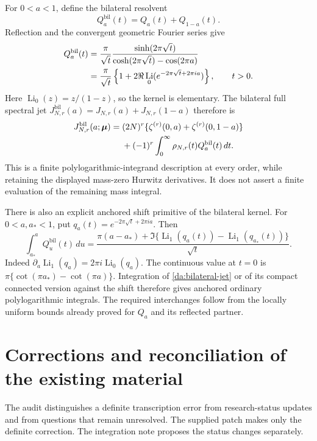 \documentclass[11pt,letterpaper]{article}
\numberwithin{equation}{section}
\theoremstyle{definition}
\theoremstyle{remark}
\DeclareMathOperator{\Li}{Li}
\newcommand{\dd}{\,d}
\begin{document}
For \(0<a<1\), define the bilateral resolvent
\[
 Q_a^{\mathrm{bil}}(t)=Q_a(t)+Q_{1-a}(t).
\]
Reflection and the convergent geometric Fourier series give
\begin{align}
 Q_a^{\mathrm{bil}}(t)
 &=\frac{\pi}{\sqrt t}
     \frac{\sinh(2\pi\sqrt t)}
          {\cosh(2\pi\sqrt t)-\cos(2\pi a)}\notag\\
 &=\frac{\pi}{\sqrt t}
       \left\{1+2\Re\Li_0(e^{-2\pi\sqrt t+2\pi ia})\right\},
             \qquad t>0. \label{da:bilateral-kernel}
\end{align}
Here \(\Li_0(z)=z/(1-z)\), so the kernel is elementary.
The bilateral full spectral jet
\(J_{N,r}^{\mathrm{bil}}(a)=J_{N,r}(a)+J_{N,r}(1-a)\) therefore is
\begin{align}
 J_{N,r}^{\mathrm{bil}}(a;\boldsymbol\mu)
 ={}&(2N)^r\{\zeta^{(r)}(0,a)+\zeta^{(r)}(0,1-a)\}\notag\\
 &+(-1)^r\int_0^\infty
          \rho_{N,r}(t)Q_a^{\mathrm{bil}}(t)\dd t.
 \label{da:bilateral-jet}
\end{align}
This is a finite polylogarithmic-integrand description at every order,
while retaining the displayed mass-zero Hurwitz derivatives. It does not
assert a finite evaluation of the remaining mass integral.

There is also an explicit anchored shift primitive of the bilateral
kernel. For \(0<a,a_*<1\), put \(q_a(t)=e^{-2\pi\sqrt t+2\pi ia}\). Then
\begin{equation}\label{da:bilateral-primitive}
 \int_{a_*}^{a}Q_u^{\mathrm{bil}}(t)\dd u
   =\frac{\pi(a-a_*)+
          \Im\{\Li_1(q_a(t))-\Li_1(q_{a_*}(t))\}}{\sqrt t}.
\end{equation}
Indeed \(\partial_a\Li_1(q_a)=2\pi i\Li_0(q_a)\).
The continuous value at \(t=0\) is
\(\pi\{\cot(\pi a_*)-\cot(\pi a)\}\).
Integration of \eqref{da:bilateral-jet} or of its compact connected
version against the shift therefore gives anchored ordinary
polylogarithmic integrals. The required interchanges follow from the
locally uniform bounds already proved for \(Q_a\) and its reflected
partner.



\section{Corrections and reconciliation of the existing material}
\label{au:section}

The audit distinguishes a definite transcription error from research-status
updates and from questions that remain unresolved. The supplied patch makes
only the definite correction. The integration note proposes the status
changes separately.
\end{document}
